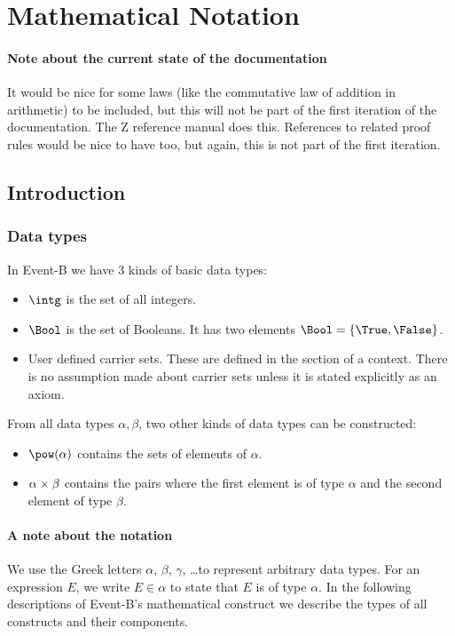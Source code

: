 \section{Mathematical Notation}
\label{reference_03}

\paragraph{Note about the current state of the documentation}
It would be nice for some laws (like the commutative law of addition in arithmetic) to be included, but this will not be part of the first iteration of the documentation. The Z reference manual does this.
References to related proof rules would be nice to have too, but again, this is not part of the first iteration.

\subsection{Introduction}

\subsubsection{Data types}
\label{data_types}

In Event-B we have 3 kinds of basic data types:
\begin{itemize}
\item $\intg$ is the set of all integers.
\item $\Bool$ is the set of Booleans. 
  It has two elements $\Bool = \{\True,\False\}$.
\item User defined carrier sets. 
  These are defined in the  section of a context.
  There is no assumption made about carrier sets unless it is stated explicitly as
  an axiom.
\end{itemize}
From all data types $\alpha, \beta$, two other kinds of data types can be constructed:
\begin{itemize}
\item $\pow(\alpha)$ contains the sets of elements of $\alpha$.
\item $\alpha\mathbin\times\beta$ contains the pairs where the first element is of type $\alpha$ and the
  second element of type $\beta$.
\end{itemize}
\paragraph{A note about the notation}
We use the Greek letters $\alpha$, $\beta$, $\gamma$, \ldots to represent arbitrary data types.
For an expression $E$, we write $E\in\alpha$ to state that $E$ is of type $\alpha$.
In the following descriptions of Event-B's mathematical construct we describe the
  types of all constructs and their components.

